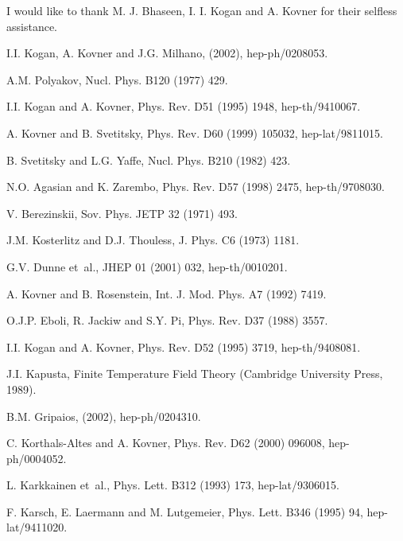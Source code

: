 \documentclass[a4paper,a4paper]{article}
\begin{document}
I would like to thank M. J. Bhaseen, I. I. Kogan and A. Kovner for their selfless assistance.
\begin{thebibliography}{10}

I.I. Kogan, A. Kovner and J.G. Milhano,
\newblock (2002), hep-ph/0208053.

A.M. Polyakov,
\newblock Nucl. Phys. B120 (1977) 429.

I.I. Kogan and A. Kovner,
\newblock Phys. Rev. D51 (1995) 1948, hep-th/9410067.

A. Kovner and B. Svetitsky,
\newblock Phys. Rev. D60 (1999) 105032, hep-lat/9811015.

B. Svetitsky and L.G. Yaffe,
\newblock Nucl. Phys. B210 (1982) 423.

N.O. Agasian and K. Zarembo,
\newblock Phys. Rev. D57 (1998) 2475, hep-th/9708030.

V. Berezinskii,
\newblock Sov. Phys. JETP 32 (1971) 493.

J.M. Kosterlitz and D.J. Thouless,
\newblock J. Phys. C6 (1973) 1181.

G.V. Dunne et~al.,
\newblock JHEP 01 (2001) 032, hep-th/0010201.

A. Kovner and B. Rosenstein,
\newblock Int. J. Mod. Phys. A7 (1992) 7419.

O.J.P. Eboli, R. Jackiw and S.Y. Pi,
\newblock Phys. Rev. D37 (1988) 3557.

I.I. Kogan and A. Kovner,
\newblock Phys. Rev. D52 (1995) 3719, hep-th/9408081.

J.I. Kapusta,
\newblock Finite Temperature Field Theory (Cambridge University Press, 1989).

B.M. Gripaios,
\newblock (2002), hep-ph/0204310.

C. Korthals-Altes and A. Kovner,
\newblock Phys. Rev. D62 (2000) 096008, hep-ph/0004052.

L. Karkkainen et~al.,
\newblock Phys. Lett. B312 (1993) 173, hep-lat/9306015.

F. Karsch, E. Laermann and M. Lutgemeier,
\newblock Phys. Lett. B346 (1995) 94, hep-lat/9411020.

\end{thebibliography}
\end{document}

